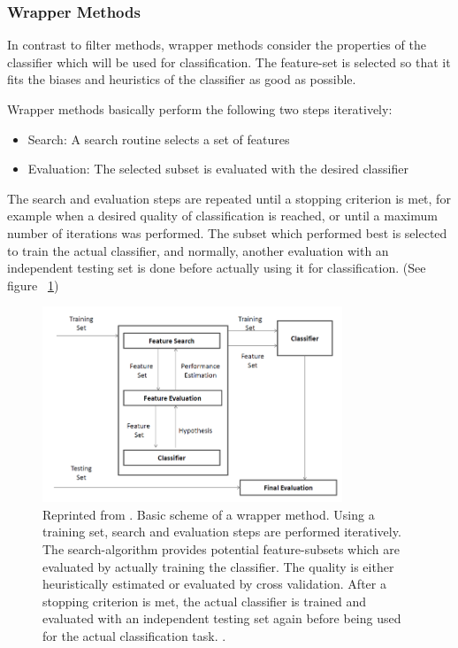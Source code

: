 \subsubsection{Wrapper Methods}
\label{sec:methods.flat.wrapper}


In contrast to filter methods, wrapper methods consider the properties of the classifier which will be used for classification.
The feature-set is selected so that it fits the biases and heuristics of the classifier as good as possible. 

Wrapper methods basically perform the following two steps iteratively: 

\begin{itemize}
  \item Search: A search routine selects a set of features 
  \item Evaluation: The selected subset is evaluated with the desired classifier
\end{itemize}

The search and evaluation steps are repeated until a stopping criterion is met, for example when a desired quality of classification is reached, 
or until a maximum number of iterations was performed. The subset which performed best is selected to train the actual classifier,
and normally, another evaluation with an independent testing set is done before actually using it for classification.
(See figure ~\ref{fig:methods.flat.wrapper.diagramm}) 

\begin{figure}[!ht]
  \centering 
  \includegraphics[width=0.8\textwidth]{chapters/methods/flat/wrapper_diagramm}
  \caption{Reprinted from \cite{Tang:04}. Basic scheme of a wrapper method. Using a training set, search and evaluation steps are performed iteratively.
	The search-algorithm provides potential feature-subsets which are evaluated by actually training the classifier. The quality is either heuristically estimated
	or evaluated by cross validation. After a stopping criterion is met, the actual classifier is trained and evaluated with an independent testing set again before
	being used for the actual classification task.
  .}
  \label{fig:methods.flat.wrapper.diagramm}
\end{figure}

